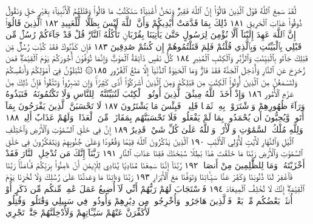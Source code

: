 لَّقَدْ سَمِعَ ٱللَّهُ قَوْلَ ٱلَّذِينَ قَالُوٓا۟ إِنَّ ٱللَّهَ فَقِيرࣱ وَنَحْنُ أَغْنِيَآءُۘ
سَنَكْتُبُ مَا قَالُوا۟ وَقَتْلَهُمُ ٱلْأَنۢبِيَآءَ بِغَيْرِ حَقࣲّ وَنَقُولُ
ذُوقُوا۟ عَذَابَ ٱلْحَرِيقِ ١٨١ ذَٰلِكَ بِمَا قَدَّمَتْ أَيْدِيكُمْ
وَأَنَّ ٱللَّهَ لَيْسَ بِظَلَّامࣲ لِّلْعَبِيدِ ١٨٢ ٱلَّذِينَ قَالُوٓا۟ إِنَّ ٱللَّهَ
عَهِدَ إِلَيْنَآ أَلَّا نُؤْمِنَ لِرَسُولٍ حَتَّىٰ يَأْتِيَنَا بِقُرْبَانࣲ
تَأْكُلُهُ ٱلنَّارُۗ قُلْ قَدْ جَآءَكُمْ رُسُلࣱ مِّن قَبْلِي بِٱلْبَيِّنَٰتِ
وَبِٱلَّذِي قُلْتُمْ فَلِمَ قَتَلْتُمُوهُمْ إِن كُنتُمْ صَٰدِقِينَ ١٨٣
فَإِن كَذَّبُوكَ فَقَدْ كُذِّبَ رُسُلࣱ مِّن قَبْلِكَ جَآءُو
بِٱلْبَيِّنَٰتِ وَٱلزُّبُرِ وَٱلْكِتَٰبِ ٱلْمُنِيرِ ١٨٤ كُلُّ نَفْسࣲ
ذَآئِقَةُ ٱلْمَوْتِۗ وَإِنَّمَا تُوَفَّوْنَ أُجُورَكُمْ يَوْمَ ٱلْقِيَٰمَةِۖ
فَمَن زُحْزِحَ عَنِ ٱلنَّارِ وَأُدْخِلَ ٱلْجَنَّةَ فَقَدْ فَازَۗ وَمَا
ٱلْحَيَوٰةُ ٱلدُّنْيَآ إِلَّا مَتَٰعُ ٱلْغُرُورِ ١٨٥۞ لَتُبْلَوُنَّ فِيٓ
أَمْوَٰلِكُمْ وَأَنفُسِكُمْ وَلَتَسْمَعُنَّ مِنَ ٱلَّذِينَ أُوتُوا۟
ٱلْكِتَٰبَ مِن قَبْلِكُمْ وَمِنَ ٱلَّذِينَ أَشْرَكُوٓا۟ أَذࣰى كَثِيرࣰاۚ
وَإِن تَصْبِرُوا۟ وَتَتَّقُوا۟ فَإِنَّ ذَٰلِكَ مِنْ عَزْمِ ٱلْأُمُورِ ١٨٦
وَإِذْ أَخَذَ ٱللَّهُ مِيثَٰقَ ٱلَّذِينَ أُوتُوا۟ ٱلْكِتَٰبَ لَتُبَيِّنُنَّهُۥ لِلنَّاسِ
وَلَا تَكْتُمُونَهُۥ فَنَبَذُوهُ وَرَآءَ ظُهُورِهِمْ وَٱشْتَرَوْا۟ بِهِۦ ثَمَنࣰا
قَلِيلࣰاۖ فَبِئْسَ مَا يَشْتَرُونَ ١٨٧ لَا تَحْسَبَنَّ ٱلَّذِينَ يَفْرَحُونَ بِمَآ
أَتَوا۟ وَّيُحِبُّونَ أَن يُحْمَدُوا۟ بِمَا لَمْ يَفْعَلُوا۟ فَلَا تَحْسَبَنَّهُم
بِمَفَازَةࣲ مِّنَ ٱلْعَذَابِۖ وَلَهُمْ عَذَابٌ أَلِيمࣱ ١٨٨ وَلِلَّهِ مُلْكُ
ٱلسَّمَٰوَٰتِ وَٱلْأَرْضِۗ وَٱللَّهُ عَلَىٰ كُلِّ شَيْءࣲ قَدِيرٌ ١٨٩ إِنَّ فِي
خَلْقِ ٱلسَّمَٰوَٰتِ وَٱلْأَرْضِ وَٱخْتِلَٰفِ ٱلَّيْلِ وَٱلنَّهَارِ لَأٓيَٰتࣲ
لِّأُو۟لِي ٱلْأَلْبَٰبِ ١٩٠ ٱلَّذِينَ يَذْكُرُونَ ٱللَّهَ قِيَٰمࣰا وَقُعُودࣰا
وَعَلَىٰ جُنُوبِهِمْ وَيَتَفَكَّرُونَ فِي خَلْقِ ٱلسَّمَٰوَٰتِ وَٱلْأَرْضِ
رَبَّنَا مَا خَلَقْتَ هَٰذَا بَٰطِلࣰا سُبْحَٰنَكَ فَقِنَا عَذَابَ ٱلنَّارِ ١٩١
رَبَّنَآ إِنَّكَ مَن تُدْخِلِ ٱلنَّارَ فَقَدْ أَخْزَيْتَهُۥۖ وَمَا لِلظَّٰلِمِينَ مِنْ
أَنصَارࣲ ١٩٢ رَّبَّنَآ إِنَّنَا سَمِعْنَا مُنَادِيࣰا يُنَادِي لِلْإِيمَٰنِ أَنْ
ءَامِنُوا۟ بِرَبِّكُمْ فَـَٔامَنَّاۚ رَبَّنَا فَٱغْفِرْ لَنَا ذُنُوبَنَا وَكَفِّرْ عَنَّا
سَيِّـَٔاتِنَا وَتَوَفَّنَا مَعَ ٱلْأَبْرَارِ ١٩٣ رَبَّنَا وَءَاتِنَا مَا وَعَدتَّنَا عَلَىٰ
رُسُلِكَ وَلَا تُخْزِنَا يَوْمَ ٱلْقِيَٰمَةِۖ إِنَّكَ لَا تُخْلِفُ ٱلْمِيعَادَ ١٩٤
فَٱسْتَجَابَ لَهُمْ رَبُّهُمْ أَنِّي لَآ أُضِيعُ عَمَلَ عَٰمِلࣲ مِّنكُم مِّن
ذَكَرٍ أَوْ أُنثَىٰۖ بَعْضُكُم مِّنۢ بَعْضࣲۖ فَٱلَّذِينَ هَاجَرُوا۟
وَأُخْرِجُوا۟ مِن دِيَٰرِهِمْ وَأُوذُوا۟ فِي سَبِيلِي وَقَٰتَلُوا۟ وَقُتِلُوا۟
لَأُكَفِّرَنَّ عَنْهُمْ سَيِّـَٔاتِهِمْ وَلَأُدْخِلَنَّهُمْ جَنَّٰتࣲ تَجْرِي
